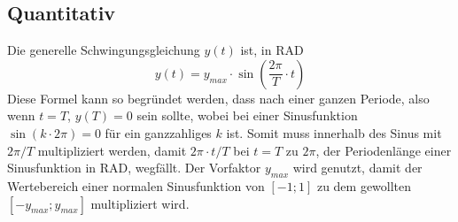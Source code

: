\documentclass{article}
\begin{document}
\subsection{Quantitativ}
Die generelle Schwingungsgleichung $y(t)$ ist, in RAD
\[
 y(t) = y_{max} \cdot \sin{\left(\frac{2\pi}{T} \cdot t\right)}
\]
Diese Formel kann so begründet werden, dass nach einer ganzen Periode, also wenn $t=T$, $y(T)=0$ sein sollte, wobei bei einer Sinusfunktion $\sin{(k \cdot 2\pi)} = 0$ für ein ganzzahliges $k$ ist. Somit muss innerhalb des Sinus mit $2\pi / T$ multipliziert werden, damit $2\pi \cdot t/T$ bei $t=T$ zu $2\pi$, der Periodenlänge einer Sinusfunktion in RAD, wegfällt. \newline
Der Vorfaktor $y_{max}$ wird genutzt, damit der Wertebereich einer normalen Sinusfunktion von $[-1; 1]$ zu dem gewollten $[-y_{max}; y_{max}]$ multipliziert wird. 
\end{document}
